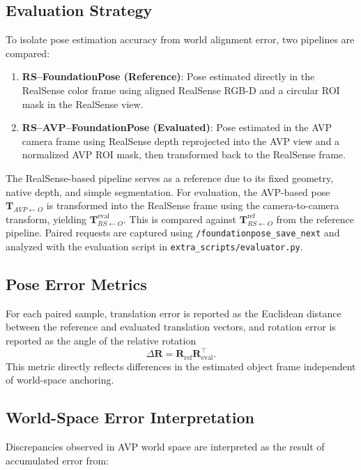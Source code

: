 \documentclass[11pt]{article}
\begin{document}
\subsection{Evaluation Strategy}

To isolate pose estimation accuracy from world alignment error, two pipelines are compared:

\begin{enumerate}
    \item \textbf{RS--FoundationPose (Reference)}: Pose estimated directly in the RealSense color frame using aligned RealSense RGB-D and a circular ROI mask in the RealSense view.
    \item \textbf{RS--AVP--FoundationPose (Evaluated)}: Pose estimated in the AVP camera frame using RealSense depth reprojected into the AVP view and a normalized AVP ROI mask, then transformed back to the RealSense frame.
\end{enumerate}

The RealSense-based pipeline serves as a reference due to its fixed geometry, native depth, and simple segmentation. For evaluation, the AVP-based pose $\mathbf{T}_{AVP \leftarrow O}$ is transformed into the RealSense frame using the camera-to-camera transform, yielding $\mathbf{T}^{\text{eval}}_{RS \leftarrow O}$. This is compared against $\mathbf{T}^{\text{ref}}_{RS \leftarrow O}$ from the reference pipeline. Paired requests are captured using \texttt{/foundationpose\_save\_next} and analyzed with the evaluation script in \texttt{extra\_scripts/evaluator.py}.

\subsection{Pose Error Metrics}

For each paired sample, translation error is reported as the Euclidean distance between the reference and evaluated translation vectors, and rotation error is reported as the angle of the relative rotation
\[
\Delta \mathbf{R} = \mathbf{R}_{\text{ref}} \mathbf{R}_{\text{eval}}^\top.
\]
This metric directly reflects differences in the estimated object frame independent of world-space anchoring.

\subsection{World-Space Error Interpretation}

Discrepancies observed in AVP world space are interpreted as the result of accumulated error from:
\end{document}
